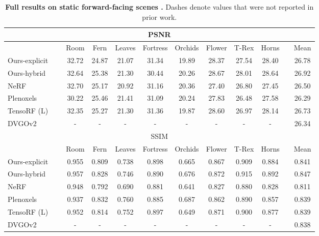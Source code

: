 \documentclass[10pt,twocolumn,letterpaper]{article}
\begin{document}
\renewcommand{\tabcolsep}{6pt}
\begin{table*}
  \centering
  \begin{tabular}{llcccccccclc}
    \multicolumn{12}{c}{PSNR } \\
    \toprule
    && Room & Fern & Leaves & Fortress & Orchids & Flower & T-Rex & Horns && Mean \\ 
    \cmidrule(){1-1} \cmidrule(){3-10} \cmidrule(){12-12}
    Ours-explicit              && 32.72 & 24.87 & 21.07 & 31.34 & 19.89 & 28.37 & 27.54 & 28.40 && 26.78 \\
    Ours-hybrid                && 32.64 & 25.38 & 21.30 & 30.44 & 20.26 & 28.67 & 28.01 & 28.64 && 26.92 \\
    NeRF~\cite{nerf}           && 32.70 & 25.17 & 20.92 & 31.16 & 20.36 & 27.40 & 26.80 & 27.45 && 26.50 \\
    Plenoxels~\cite{plenoxels} && 30.22 & 25.46 & 21.41 & 31.09 & 20.24 & 27.83 & 26.48 & 27.58 && 26.29 \\
    TensoRF (L)~\cite{tensorf} && 32.35 & 25.27 & 21.30 & 31.36 & 19.87 & 28.60 & 26.97 & 28.14 && 26.73 \\
    DVGOv2~\cite{dvgo}         && -     & -     & -     & -     & -     & -     & -     & -     && 26.34 \\
    \bottomrule
    
    \multicolumn{12}{c}{SSIM } \\
    \toprule
    && Room & Fern & Leaves & Fortress & Orchids & Flower & T-Rex & Horns && Mean \\ 
    \cmidrule(){1-1} \cmidrule(){3-10} \cmidrule(){12-12}
    Ours-explicit              && 0.955 & 0.809 & 0.738 & 0.898 & 0.665 & 0.867 & 0.909 & 0.884 && 0.841 \\
    Ours-hybrid                && 0.957 & 0.828 & 0.746 & 0.890 & 0.676 & 0.872 & 0.915 & 0.892 && 0.847 \\
    NeRF~\cite{nerf}           && 0.948 & 0.792 & 0.690 & 0.881 & 0.641 & 0.827 & 0.880 & 0.828 && 0.811 \\
    Plenoxels~\cite{plenoxels} && 0.937 & 0.832 & 0.760 & 0.885 & 0.687 & 0.862 & 0.890 & 0.857 && 0.839 \\
    TensoRF (L)~\cite{tensorf} && 0.952 & 0.814 & 0.752 & 0.897 & 0.649 & 0.871 & 0.900 & 0.877 && 0.839 \\
    DVGOv2~\cite{dvgo}         && -     & -     & -     & -     & -     & -     & -     & -     && 0.838 \\
    \bottomrule
  \end{tabular}
  \caption{\textbf{Full results on static forward-facing scenes \cite{llff}.} Dashes denote values that were not reported in prior work.}
  \label{tab:full_llff}
\end{table*}
\end{document}
